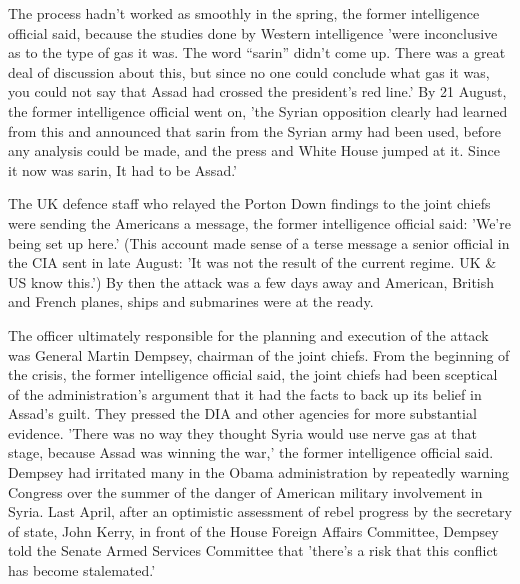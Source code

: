 The process hadn't worked as smoothly in the spring, the former intelligence
official said, because the studies done by Western intelligence 'were
inconclusive as to the type of gas it was. The word ``sarin'' didn't
come up. There was a great deal of discussion about this, but since
no one could conclude what gas it was, you could not say that Assad
had crossed the president's red line.' By 21 August, the former intelligence
official went on, 'the Syrian opposition clearly had learned from
this and announced that \textquotedbl{}sarin\textquotedbl{} from the
Syrian army had been used, before any analysis could be made, and
the press and White House jumped at it. Since it now was sarin, \textquotedbl{}It
had to be Assad.\textquotedbl{}'

The UK defence staff who relayed the Porton Down findings to the joint
chiefs were sending the Americans a message, the former intelligence
official said: 'We're being set up here.' (This account made sense
of a terse message a senior official in the CIA sent in late August:
'It was not the result of the current regime. UK \& US know this.')
By then the attack was a few days away and American, British and French
planes, ships and submarines were at the ready.

The officer ultimately responsible for the planning and execution
of the attack was General Martin Dempsey, chairman of the joint chiefs.
From the beginning of the crisis, the former intelligence official
said, the joint chiefs had been sceptical of the administration's
argument that it had the facts to back up its belief in Assad's guilt.
They pressed the DIA and other agencies for more substantial evidence.
'There was no way they thought Syria would use nerve gas at that stage,
because Assad was winning the war,' the former intelligence official
said. Dempsey had irritated many in the Obama administration by repeatedly
warning Congress over the summer of the danger of American military
involvement in Syria. Last April, after an optimistic assessment of
rebel progress by the secretary of state, John Kerry, in front of
the House Foreign Affairs Committee, Dempsey told the Senate Armed
Services Committee that 'there's a risk that this conflict has become
stalemated.'

